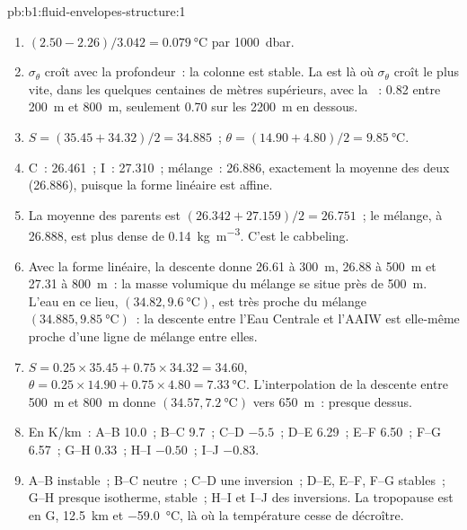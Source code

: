 \begin{solution}{pb:b1:fluid-envelopes-structure:1}
\begin{enumerate}
        Austral. Le maximum à \qty{3000}{m}, 34.90 à
        \qty{2.5}{\celsius}, est l'Eau Profonde Nord-Atlantique, formée dans les
        mers du Groenland et du Labrador.
  \item $(2.50 - 2.26)/3.042 = \qty{0.079}{\celsius}$ par \qty{1000}{dbar}.
  \item $\sigma_\theta$ croît avec la profondeur~: la colonne est stable. La
         est là où $\sigma_\theta$ croît le plus vite, dans les quelques
        centaines de mètres supérieurs, avec la ~: \num{0.82} entre
        \qty{200}{m} et \qty{800}{m}, seulement \num{0.70} sur les
        \qty{2200}{m} en dessous.
  \item $S = (35.45 + 34.32)/2 = 34.885$~; $\theta = (14.90 + 4.80)/2 =
        \qty{9.85}{\celsius}$.
  \item C~: 26.461~; I~: 27.310~; mélange~: 26.886, exactement la moyenne des deux
        (26.886), puisque la forme linéaire est affine.
  \item La moyenne des parents est $(26.342 + 27.159)/2 = 26.751$~; le mélange,
        à 26.888, est plus dense de \qty{0.14}{kg.m^{-3}}. C'est le cabbeling.
  \item Avec la forme linéaire, la descente donne 26.61 à \qty{300}{m}, 26.88 à
        \qty{500}{m} et 27.31 à \qty{800}{m}~: la masse volumique du mélange se situe près de
        \qty{500}{m}. L'eau en ce lieu, $(34.82, \qty{9.6}{\celsius})$, est très
        proche du mélange $(34.885, \qty{9.85}{\celsius})$~: la descente entre
        l'Eau Centrale et l'AAIW est elle-même proche d'une ligne de mélange entre
        elles.
  \item $S = 0.25 \times 35.45 + 0.75 \times 34.32 = 34.60$, $\theta = 0.25
        \times 14.90 + 0.75 \times 4.80 = \qty{7.33}{\celsius}$. L'interpolation de
        la descente entre \qty{500}{m} et \qty{800}{m} donne
        $(34.57, \qty{7.2}{\celsius})$ vers \qty{650}{m}~: presque dessus.
  \item En \si{K/km}~: A--B 10.0~; B--C 9.7~; C--D $-5.5$~; D--E 6.29~; E--F 6.50~;
        F--G 6.57~; G--H 0.33~; H--I $-0.50$~; I--J $-0.83$.
  \item A--B instable~; B--C neutre~; C--D une inversion~; D--E, E--F, F--G stables~;
        G--H presque isotherme, stable~; H--I et I--J des inversions. La tropopause
        est en G, \qty{12.5}{km} et \qty{-59.0}{\celsius}, là où la température
        cesse de décroître.

\end{enumerate}
\end{solution}
